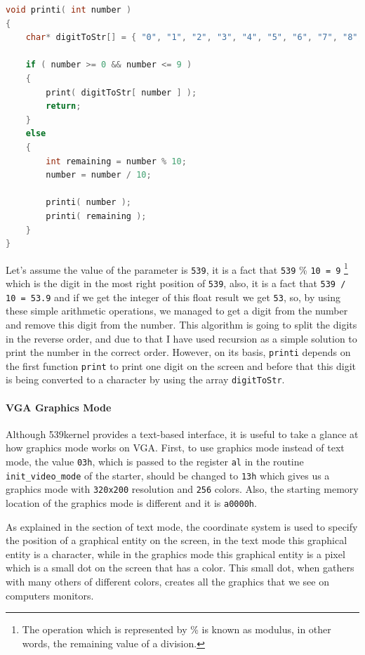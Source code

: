 \begin{lstlisting}[language=C]
void printi( int number )
{
    char* digitToStr[] = { "0", "1", "2", "3", "4", "5", "6", "7", "8", "9" };
    
    if ( number >= 0 && number <= 9 )
    {
        print( digitToStr[ number ] );
        return;
    }
    else
    {
        int remaining = number % 10;
        number = number / 10;
        
        printi( number );
        printi( remaining );
    }
}
\end{lstlisting}

Let's assume the value of the parameter is \lstinline!539!, it is a fact
that \lstinline!539! \% \lstinline!10 = 9! \footnote{The operation which
  is represented by \% is known as modulus, in other words, the
  remaining value of a division.} which is the digit in the most right
position of \lstinline!539!, also, it is a fact that
\lstinline!539 / 10 = 53.9! and if we get the integer of this float
result we get \lstinline!53!, so, by using these simple arithmetic
operations, we managed to get a digit from the number and remove this
digit from the number. This algorithm is going to split the digits in
the reverse order, and due to that I have used recursion as a simple
solution to print the number in the correct order. However, on its
basis, \lstinline!printi! depends on the first function
\lstinline!print! to print one digit on the screen and before that this
digit is being converted to a character by using the array
\lstinline!digitToStr!.

\paragraph{VGA Graphics Mode}\label{vga-graphics-mode}

Although 539kernel provides a text-based interface, it is useful to take
a glance at how graphics mode works on VGA. First, to use graphics mode
instead of text mode, the value \lstinline!03h!, which is passed to the
register \lstinline!al! in the routine \lstinline!init_video_mode! of
the starter, should be changed to \lstinline!13h! which gives us a
graphics mode with \lstinline!320x200! resolution and \lstinline!256!
colors. Also, the starting memory location of the graphics mode is
different and it is \lstinline!a0000h!.

As explained in the section of text mode, the coordinate system is used
to specify the position of a graphical entity on the screen, in the text
mode this graphical entity is a character, while in the graphics mode
this graphical entity is a pixel which is a small dot on the screen that
has a color. This small dot, when gathers with many others of different
colors, creates all the graphics that we see on computers monitors.


